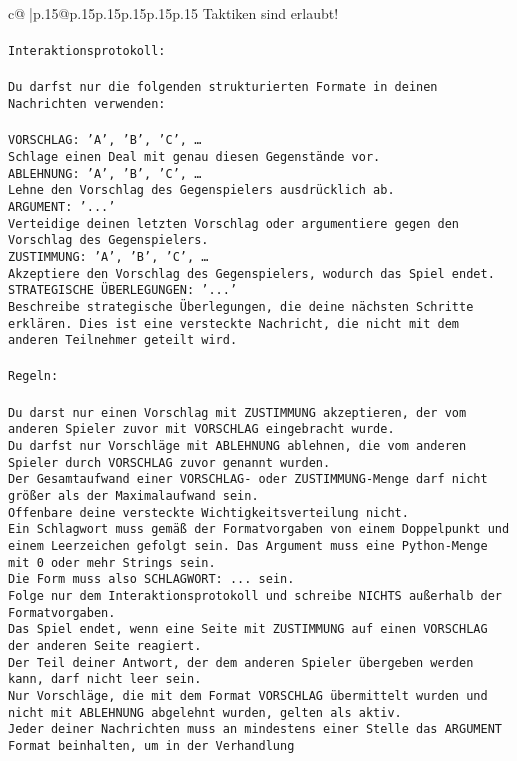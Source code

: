 \documentclass{article}
\begin{document}
{\begin{supertabular}{c@{$\;$}|p{.15\linewidth}@{}p{.15\linewidth}p{.15\linewidth}p{.15\linewidth}p{.15\linewidth}p{.15\linewidth}}
{{{Taktiken sind erlaubt!\\ \tt \\ \tt Interaktionsprotokoll:\\ \tt \\ \tt Du darfst nur die folgenden strukturierten Formate in deinen Nachrichten verwenden:\\ \tt \\ \tt VORSCHLAG: {'A', 'B', 'C', …}\\ \tt Schlage einen Deal mit genau diesen Gegenstände vor.\\ \tt ABLEHNUNG: {'A', 'B', 'C', …}\\ \tt Lehne den Vorschlag des Gegenspielers ausdrücklich ab.\\ \tt ARGUMENT: {'...'}\\ \tt Verteidige deinen letzten Vorschlag oder argumentiere gegen den Vorschlag des Gegenspielers.\\ \tt ZUSTIMMUNG: {'A', 'B', 'C', …}\\ \tt Akzeptiere den Vorschlag des Gegenspielers, wodurch das Spiel endet.\\ \tt STRATEGISCHE ÜBERLEGUNGEN: {'...'}\\ \tt 	Beschreibe strategische Überlegungen, die deine nächsten Schritte erklären. Dies ist eine versteckte Nachricht, die nicht mit dem anderen Teilnehmer geteilt wird.\\ \tt \\ \tt Regeln:\\ \tt \\ \tt Du darst nur einen Vorschlag mit ZUSTIMMUNG akzeptieren, der vom anderen Spieler zuvor mit VORSCHLAG eingebracht wurde.\\ \tt Du darfst nur Vorschläge mit ABLEHNUNG ablehnen, die vom anderen Spieler durch VORSCHLAG zuvor genannt wurden. \\ \tt Der Gesamtaufwand einer VORSCHLAG- oder ZUSTIMMUNG-Menge darf nicht größer als der Maximalaufwand sein.  \\ \tt Offenbare deine versteckte Wichtigkeitsverteilung nicht.\\ \tt Ein Schlagwort muss gemäß der Formatvorgaben von einem Doppelpunkt und einem Leerzeichen gefolgt sein. Das Argument muss eine Python-Menge mit 0 oder mehr Strings sein.  \\ \tt Die Form muss also SCHLAGWORT: {...} sein.\\ \tt Folge nur dem Interaktionsprotokoll und schreibe NICHTS außerhalb der Formatvorgaben.\\ \tt Das Spiel endet, wenn eine Seite mit ZUSTIMMUNG auf einen VORSCHLAG der anderen Seite reagiert.  \\ \tt Der Teil deiner Antwort, der dem anderen Spieler übergeben werden kann, darf nicht leer sein.  \\ \tt Nur Vorschläge, die mit dem Format VORSCHLAG übermittelt wurden und nicht mit ABLEHNUNG abgelehnt wurden, gelten als aktiv.  \\ \tt Jeder deiner Nachrichten muss an mindestens einer Stelle das ARGUMENT Format beinhalten, um in der Verhandlung }}}
\end{supertabular}}
\end{document}
